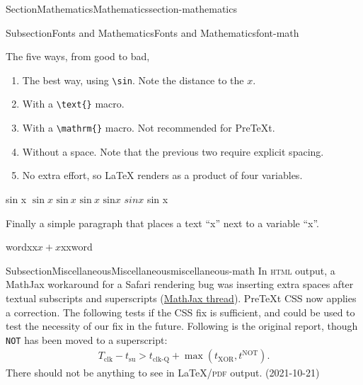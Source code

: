 \documentclass[twoside,10pt,]{article}
\newcommand{\mono}[1]{\texttt{#1}}
\newcommand{\initialism}[1]{\textsc{\MakeLowercase{#1}}}
\numberwithin{equation}{section}
\newcommand{\gt}{>}
\begin{document}
\begin{sectionptx}{Section}{Mathematics}{}{Mathematics}{}{}{section-mathematics}
\begin{subsectionptx}{Subsection}{Fonts and Mathematics}{}{Fonts and Mathematics}{}{}{font-math}
\begin{codedisplay}
\end{codedisplay}
The five ways, from good to bad,%
\begin{enumerate}
\item{}The best way, using  \mono{\textbackslash{}sin}.  Note the distance to the \(x\).%
\item{}With a \mono{\textbackslash{}text\{\}} macro.%
\item{}With a \mono{\textbackslash{}mathrm\{\}} macro.  Not recommended for PreTeXt.%
\item{}Without a space.  Note that the previous two require explicit spacing.%
\item{}No extra effort, so \LaTeX{} renders as a product of four variables.%
\end{enumerate}
%
\par
sin x \textbar{} \(\sin x\) \textbar{} \(\text{sin}\ x\) \textbar{} \(\mathrm{sin}\ x\)  \textbar{} \(\text{sin}x\) \textbar{} \(sin x\) \textbar{} sin x%
\par
Finally a simple paragraph that places a text ``x'' next to a variable ``x''.%
\par
wordxx\(x+x\)xxword%
\end{subsectionptx}
%
%
\typeout{************************************************}
\typeout{************************************************}
%
\begin{subsectionptx}{Subsection}{Miscellaneous}{}{Miscellaneous}{}{}{miscellaneous-math}
In \initialism{HTML} output, a MathJax workaround for a Safari rendering bug was inserting extra spaces after textual subscripts and superscripts (\href{https://groups.google.com/g/mathjax-users/c/ANjLK9KtcWA/m/vlHaPja-AwAJ}{MathJax thread}).  PreTeXt CSS now applies a correction.  The following tests if the CSS fix is sufficient, and could be used to test the necessity of our fix in the future.  Following is the original report, though \mono{NOT} has been moved to a superscript:%
\begin{gather*}
T_\text{clk}-t_\text{su} \gt t_\text{clk-Q} + \max\left( t_\text{XOR}, t^\text{NOT} \right)\text{.}
\end{gather*}
There should not be anything to see in \LaTeX{}\slash{}\initialism{PDF} output. (2021-10-21)%
\end{subsectionptx}
\end{sectionptx}
%
%
\typeout{************************************************}
\typeout{************************************************}
\end{document}
